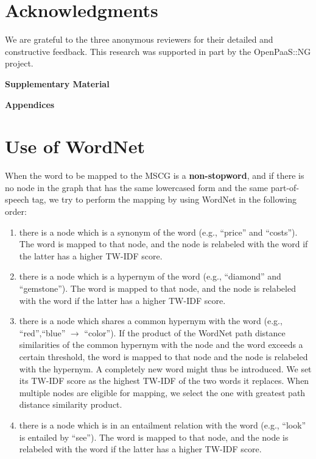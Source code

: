 \documentclass[11pt,a4paper]{article}
\begin{document}
\vspace{-0.15cm}

\section*{Acknowledgments}
We are grateful to the three anonymous reviewers for their detailed and constructive feedback. This research was supported in part by the OpenPaaS::NG project. 




\onecolumn
\newpage
\begin{center}
\textbf{\Large Supplementary Material}
\end{center}
\textbf{\Large Appendices}
\appendix
\section{Use of WordNet} \label{app:word_net}

When the word to be mapped to the MSCG is a \textbf{non-stopword}, and if there is no node in the graph that has the same lowercased form and the same part-of-speech tag, we try to perform the mapping by using WordNet in the following order:

\begin{enumerate}[label=(\roman*), leftmargin=*]
\setlength\itemsep{0em}
\item there is a node which is a synonym of the word (e.g., ``price'' and ``costs''). The word is mapped to that node, and the node is relabeled with the word if the latter has a higher TW-IDF score.

\item there is a node which is a hypernym of the word (e.g., ``diamond'' and ``gemstone''). The word is mapped to that node, and the node is relabeled with the word if the latter has a higher TW-IDF score.

\item there is a node which shares a common hypernym with the word (e.g., ``red'',``blue'' $\rightarrow$ ``color''). If the product of the WordNet path distance similarities of the common hypernym with the node and the word exceeds a certain threshold, the word is mapped to that node and the node is relabeled with the hypernym. A completely new word might thus be introduced. We set its TW-IDF score as the highest TW-IDF of the two words it replaces. When multiple nodes are eligible for mapping, we select the one with greatest path distance similarity product.

\item there is a node which is in an entailment relation with the word (e.g., ``look'' is entailed by ``see''). The word is mapped to that node, and the node is relabeled with the word if the latter has a higher TW-IDF score.
\end{enumerate}
\end{document}

